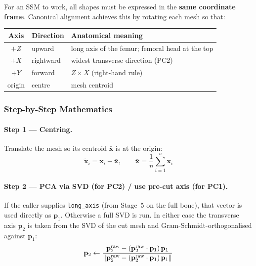 \documentclass[12pt,a4paper]{article}
\begin{document}
For an SSM to work, all shapes must be expressed in the \textbf{same coordinate
frame}.  Canonical alignment achieves this by rotating each mesh so that:

\begin{center}
\begin{tabular}{cll}
    \toprule
    \textbf{Axis} & \textbf{Direction} & \textbf{Anatomical meaning} \\
    \midrule
    $+Z$ & upward & long axis of the femur; femoral head at the top \\
    $+X$ & rightward & widest transverse direction (PC2) \\
    $+Y$ & forward & $Z \times X$ (right-hand rule) \\
    origin & centre & mesh centroid \\
    \bottomrule
\end{tabular}
\end{center}

\subsubsection{Step-by-Step Mathematics}

\paragraph{Step 1 — Centring.}
Translate the mesh so its centroid $\bar{\mathbf{x}}$ is at the origin:
\begin{equation}
    \tilde{\mathbf{x}}_i = \mathbf{x}_i - \bar{\mathbf{x}},
    \qquad
    \bar{\mathbf{x}} = \frac{1}{n}\sum_{i=1}^{n}\mathbf{x}_i
\end{equation}

\paragraph{Step 2 — PCA via SVD (for PC2) / use pre-cut axis (for PC1).}
If the caller supplies \texttt{long\_axis} (from Stage~5 on the full bone),
that vector is used directly as $\mathbf{p}_1$.  Otherwise a full SVD is run.
In either case the transverse axis $\mathbf{p}_2$ is taken from the SVD of
the cut mesh and Gram-Schmidt-orthogonalised against $\mathbf{p}_1$:
\begin{equation}
    \mathbf{p}_2 \leftarrow \frac{\mathbf{p}_2^{\rm raw}
    - (\mathbf{p}_2^{\rm raw} \cdot \mathbf{p}_1)\,\mathbf{p}_1}
    {\|\mathbf{p}_2^{\rm raw} - (\mathbf{p}_2^{\rm raw}\cdot\mathbf{p}_1)\,\mathbf{p}_1\|}
    \label{eq:gramschmidt}
\end{equation}
\end{document}
